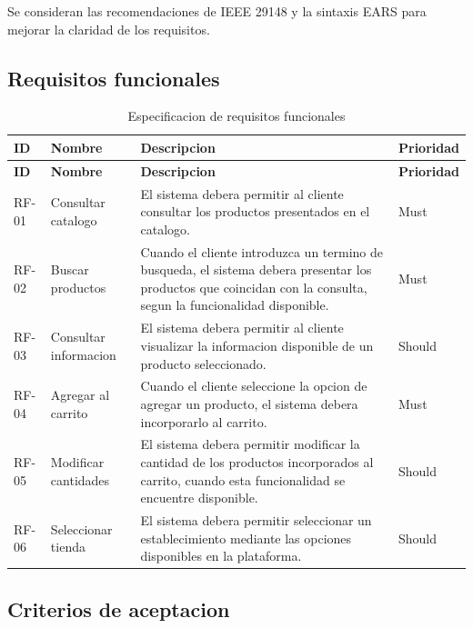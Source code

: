 \documentclass[11pt,a4paper]{article}
\begin{document}
Se consideran las recomendaciones de IEEE 29148
y la sintaxis EARS para mejorar la claridad
de los requisitos.

\subsection{Requisitos funcionales}

\begin{longtable}{p{1.5cm}p{3cm}p{7cm}p{2cm}}
\caption{Especificacion de requisitos funcionales}\\
\toprule
\textbf{ID} &
\textbf{Nombre} &
\textbf{Descripcion} &
\textbf{Prioridad} \\
\midrule
\endfirsthead

\toprule
\textbf{ID} &
\textbf{Nombre} &
\textbf{Descripcion} &
\textbf{Prioridad} \\
\midrule
\endhead

RF-01 &
Consultar catalogo &
El sistema debera permitir al cliente consultar
los productos presentados en el catalogo. &
Must \\

RF-02 &
Buscar productos &
Cuando el cliente introduzca un termino de busqueda,
el sistema debera presentar los productos que
coincidan con la consulta, segun la funcionalidad
disponible. &
Must \\

RF-03 &
Consultar informacion &
El sistema debera permitir al cliente visualizar
la informacion disponible de un producto
seleccionado. &
Should \\

RF-04 &
Agregar al carrito &
Cuando el cliente seleccione la opcion de agregar
un producto, el sistema debera incorporarlo
al carrito. &
Must \\

RF-05 &
Modificar cantidades &
El sistema debera permitir modificar la cantidad
de los productos incorporados al carrito,
cuando esta funcionalidad se encuentre disponible. &
Should \\

RF-06 &
Seleccionar tienda &
El sistema debera permitir seleccionar un
establecimiento mediante las opciones disponibles
en la plataforma. &
Should \\

\bottomrule
\end{longtable}

\subsection{Criterios de aceptacion}
\end{document}
